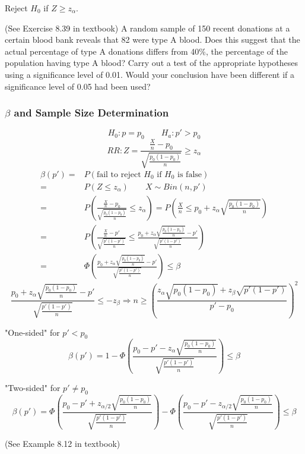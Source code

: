 Reject $H_0$ if $Z\geq z_{\alpha}$.

\begin{exmp}
(See Exercise 8.39 in textbook)
A random sample of 150 recent donations at a certain blood bank reveals that 82 were type A blood. Does this suggest that the actual percentage of type A donations differs from 40\%, the percentage of the population having type A blood? Carry out a test of the appropriate hypotheses using a significance level of 0.01. Would your conclusion have been different if a significance level of 0.05 had been used?
\end{exmp}


\subsubsection{$\beta$ and Sample Size Determination}
\[H_0:p=p_0 \qquad H_a:p'>p_0\]
\[RR:Z=\frac{\frac{X}{n}-p_0}{\sqrt{\frac{p_0(1-p_0)}{n}}}\geq z_{\alpha}\]
\begin{align*}
\beta(p') =& P(\text{fail to reject }H_0 \text{ if }H_0 \text{ is false}) \\
= & P(Z\leq z_{\alpha}) \qquad X \sim Bin(n,p') \\
= & P\left(\frac{\frac{X}{n}-p_0}{\sqrt{\frac{p_0(1-p_0)}{n}}} \leq z_{\alpha}\right) = P\left(\frac{X}{n}\leq p_0+z_{\alpha}\sqrt{\frac{p_0(1-p_0)}{n}} \right) \\
= & P\left( \frac{\frac{X}{n}-p'}{\sqrt{\frac{p'(1-p')}{n}}}  \leq \frac{p_0+z_{\alpha}\sqrt{\frac{p_0(1-p_0)}{n}}-p'}{\sqrt{\frac{p'(1-p')}{n}}} \right) \\
= & \Phi\left(\frac{p_0+z_{\alpha}\sqrt{\frac{p_0(1-p_0)}{n}}-p'}{\sqrt{\frac{p'(1-p')}{n}}}\right) \leq \beta
\end{align*}
\[\frac{p_0+z_{\alpha}\sqrt{\frac{p_0(1-p_0)}{n}}-p'}{\sqrt{\frac{p'(1-p')}{n}}} \leq -z_{\beta} \Rightarrow n \geq \left( \frac{z_{\alpha}\sqrt{p_0(1-p_0)}+z_{\beta}\sqrt{p'(1-p')}}{p'-p_0}\right)^2\]

"One-sided" for $p'<p_0$
\[\beta(p')= 1- \Phi\left(\frac{p_0-p'-z_{\alpha}\sqrt{\frac{p_0(1-p_0)}{n}}}{\sqrt{\frac{p'(1-p')}{n}}}\right) \leq \beta \]

"Two-sided" for $p'\neq p_0$
\[\beta(p')= \Phi\left(\frac{p_0-p'+z_{\alpha/2}\sqrt{\frac{p_0(1-p_0)}{n}}}{\sqrt{\frac{p'(1-p')}{n}}}\right)- \Phi\left(\frac{p_0-p'-z_{\alpha/2}\sqrt{\frac{p_0(1-p_0)}{n}}}{\sqrt{\frac{p'(1-p')}{n}}}\right) \leq \beta \]

\begin{exmp}
(See Example 8.12 in textbook)
\end{exmp}

